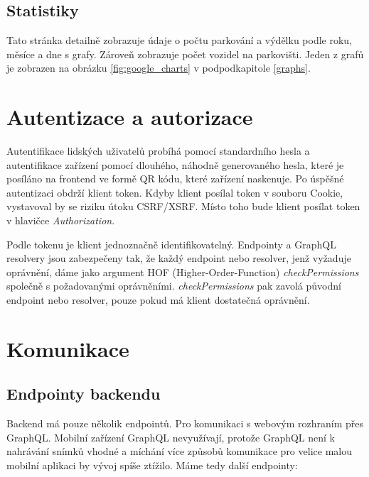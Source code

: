 \subsection{Statistiky}

\noindent
Tato stránka detailně zobrazuje údaje o počtu parkování a výdělku podle roku, měsíce a dne s grafy.
Zároveň zobrazuje počet vozidel na parkovišti.
Jeden z grafů je zobrazen na obrázku \ref{fig:google_charts} v podpodkapitole \ref{graphs}.

\newpage

\section{Autentizace a autorizace} \label{auther_authen}

\noindent
Autentifikace lidských uživatelů probíhá pomocí standardního hesla a autentifikace zařízení pomocí dlouhého,
náhodně generovaného hesla,
které je posíláno na frontend ve formě QR kódu, které zařízení naskenuje.
Po úspěšné autentizaci obdrží klient token.
Kdyby klient posílal token v souboru Cookie, vystavoval by se riziku útoku CSRF/XSRF.
Místo toho bude klient posílat token v hlavičce \textit{Authorization}.

Podle tokenu je klient jednoznačně identifikovatelný. Endpointy a GraphQL resolvery jsou zabezpečeny tak,
že každý endpoint nebo resolver, jenž vyžaduje oprávnění, dáme jako argument HOF (Higher-Order-Function)
\textit{checkPermissions} společně s požadovanými oprávněními. \textit{checkPermissions} pak zavolá původní
endpoint nebo resolver, pouze pokud má klient dostatečná oprávnění.

\section{Komunikace}

\subsection{Endpointy backendu} \label{endpoints}

\noindent
Backend má pouze několik endpointů. Pro komunikaci s webovým rozhraním přes GraphQL.
Mobilní zařízení GraphQL nevyužívají, protože GraphQL není k nahrávání snímků vhodné a míchání více způsobů
komunikace pro velice malou mobilní aplikaci by vývoj spíše ztížilo. Máme tedy další endpointy:

